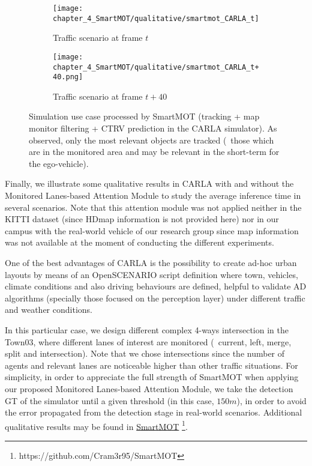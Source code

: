 \begin{figure}[]
	\begin{subfigure}{\textwidth}
		\texttt{[image: chapter\_4\_SmartMOT/qualitative/smartmot\_CARLA\_t]}
		\label{subfig:chapter_4_SmartMOT/qualitative/smartmot_CARLA_t}
		\caption{Traffic scenario at frame $t$}
	\end{subfigure}
	\begin{subfigure}{\textwidth}
		\texttt{[image: chapter\_4\_SmartMOT/qualitative/smartmot\_CARLA\_t+40.png]}
		\label{subfig:chapter_8_Applications/qualitative/smartmot_CARLA_t+40}
		\caption{Traffic scenario at frame $t+40$}
	\end{subfigure}
	\captionsetup{justification=justified}
	\caption[Simulation use case processed by SmartMOT (tracking + map monitor filtering + \ac{CTRV} prediction in the \ac{CARLA} simulator)]{Simulation use case processed by SmartMOT (tracking + map monitor filtering + \ac{CTRV} prediction in the \ac{CARLA} simulator). As observed, only the most relevant objects are tracked (\ie \ those which are in the monitored area and may be relevant in the short-term for the ego-vehicle).}
	\label{fig:chapter_4_SmartMOT/SmartMOT_CARLA}
\end{figure}

Finally, we illustrate some qualitative results in \ac{CARLA} with and without the Monitored Lanes-based Attention Module to study the average inference time in several scenarios. Note that this attention module was not applied neither in the KITTI dataset (since \ac{HDmap} information is not provided here) nor in our campus with the real-world vehicle of our research group since map information was not available at the moment of conducting the different experiments. 

One of the best advantages of \ac{CARLA} is the possibility to create ad-hoc urban layouts by means of an OpenSCENARIO \cite{jullien2009openscenario} script definition where town, vehicles, climate conditions and also driving behaviours are defined, helpful to validate \ac{AD} algorithms (specially those focused on the perception layer) under different traffic and weather conditions. 

In this particular case, we design different complex 4-ways intersection in the Town03, where different lanes of interest are monitored (\ie \ current, left, merge, split and intersection). Note that we chose intersections since the number of agents and relevant lanes are noticeable higher than other traffic situations. For simplicity, in order to appreciate the full strength of SmartMOT when applying our proposed Monitored Lanes-based Attention Module, we take the detection \ac{GT} of the simulator until a given threshold (in this case, $150m$), in order to avoid the error propagated from the detection stage in real-world scenarios. Additional qualitative results may be found in \href{https://github.com/Cram3r95/SmartMOT}{SmartMOT} \footnote{https://github.com/Cram3r95/SmartMOT}.

